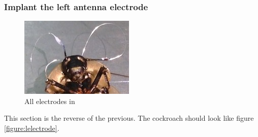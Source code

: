 \subsubsection{Implant the left antenna electrode}
\begin{figure}[ht!]
\centering
\includegraphics[scale=0.5]{Surgery Photos/lelectrode.jpg}
\caption{All electrodes in}
\label{fig:lelectrode}
\end{figure}
This section is the reverse of the previous. The cockroach should look like figure \ref{figure:lelectrode}.


